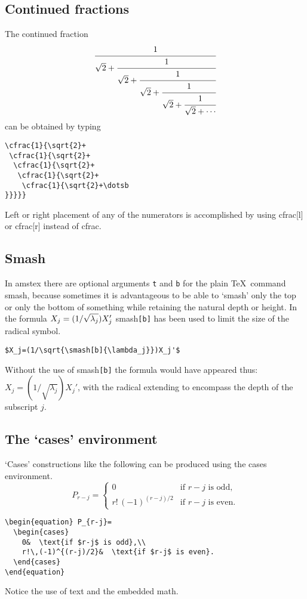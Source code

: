\documentclass[draft]{amsart}
\newcommand{\ntt}{\normalfont\ttfamily}
\newcommand{\cn}[1]{{\protect\ntt\bslash#1}}
\newcommand{\pkg}[1]{{\protect\ntt#1}}
\newcommand{\env}[1]{{\protect\ntt#1}}
\theoremstyle{definition}
\theoremstyle{remark}
\begin{document}
\subsection{Continued fractions}
The continued fraction
\begin{equation}
\cfrac{1}{\sqrt{2}+
 \cfrac{1}{\sqrt{2}+
  \cfrac{1}{\sqrt{2}+
   \cfrac{1}{\sqrt{2}+
    \cfrac{1}{\sqrt{2}+\dotsb
}}}}}
\end{equation}
can be obtained by typing
\begin{verbatim}
\cfrac{1}{\sqrt{2}+
 \cfrac{1}{\sqrt{2}+
  \cfrac{1}{\sqrt{2}+
   \cfrac{1}{\sqrt{2}+
    \cfrac{1}{\sqrt{2}+\dotsb
}}}}}
\end{verbatim}
Left or right placement of any of the numerators is accomplished by using
\cn{cfrac[l]} or \cn{cfrac[r]} instead of \cn{cfrac}.

\subsection{Smash}

In \pkg{amstex} there are optional arguments \verb"t" and
\verb"b" for the plain \TeX\
command \cn{smash}, because sometimes it is advantageous to be
able to `smash' only the top or only the bottom of something while
retaining the natural depth or height.  In the formula
 $X_j=(1/\sqrt{\smash[b]{\lambda_j}})X_j'$ \cn{smash}\verb=[b]=
has been used to limit the size of the radical symbol.
\begin{verbatim}
$X_j=(1/\sqrt{\smash[b]{\lambda_j}})X_j'$
\end{verbatim}
Without the use of \cn{smash}\verb=[b]= the formula would
have appeared thus: $X_j=(1/\sqrt{\lambda_j})X_j'$, with
the radical extending to encompass the depth of the subscript
$j$.

\subsection{The `cases' environment}
`Cases' constructions like the following can be produced using
the \env{cases} environment.
\begin{equation}
P_{r-j}=
  \begin{cases}
    0&  \text{if $r-j$ is odd},\\
    r!\,(-1)^{(r-j)/2}&  \text{if $r-j$ is even}.
  \end{cases}
\end{equation}
\begin{verbatim}
\begin{equation} P_{r-j}=
  \begin{cases}
    0&  \text{if $r-j$ is odd},\\
    r!\,(-1)^{(r-j)/2}&  \text{if $r-j$ is even}.
  \end{cases}
\end{equation}
\end{verbatim}
Notice the use of \cn{text} and the embedded math.
\end{document}
